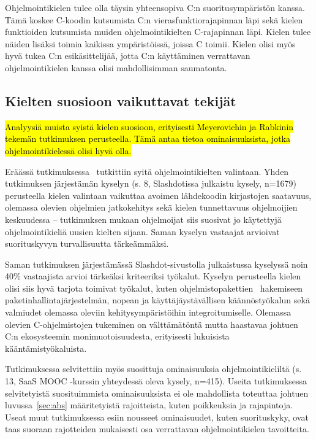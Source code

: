 \newpage

Ohjelmointikielen tulee olla täysin yhteensopiva C:n suoritusympäristön kanssa.
Tämä koskee C-koodin kutsumista C:n vierasfunktiorajapinnan
läpi sekä kielen funktioiden kutsumista
muiden ohjelmointikielten C-rajapinnan läpi. Kielen tulee näiden lisäksi toimia
kaikissa ympäristöissä, joissa C toimii. Kielen olisi myös hyvä tukea C:n
esikäsittelijää, jotta C:n käyttäminen verrattavan ohjelmointikielen kanssa
olisi mahdollisimman saumatonta.

\subsection{Kielten suosioon vaikuttavat tekijät}

\hl{Analyysiä muista syistä kielen suosioon, erityisesti Meyerovichin ja
Rabkinin tekemän tutkimuksen perusteella. Tämä antaa tietoa ominaisuuksista,
jotka ohjelmointikielessä olisi hyvä olla.}

Eräässä tutkimuksessa~\citep{empiricalpopularity} tutkittiin syitä
ohjelmointikielten valintaan. Yhden tutkimuksen järjestämän kyselyn (s. 8,
\mbox{Slashdotissa} julkaistu kysely, n=1679) perusteella kielen valintaan
vaikuttaa avoimen lähdekoodin kirjastojen saatavuus, olemassa olevien ohjelmien
jatkokehitys sekä kielen tunnettavuus ohjelmoijien keskuudessa -- tutkimuksen
mukaan ohjelmoijat siis suosivat jo käytettyjä ohjelmointikieliä uusien kielten
sijaan. Saman kyselyn vastaajat arvioivat suorituskyvyn turvallisuutta
tärkeämmäksi.

Saman tutkimuksen järjestämässä Slashdot-sivustolla julkaistussa kyselyssä noin
40\% vastaajista arvioi tärkeäksi kriteeriksi työkalut. Kyselyn perusteella
kielen olisi siis hyvä tarjota toimivat työkalut, kuten
ohjelmistopakettien~ hakemiseen
paketinhallintajärjestelmän, nopean ja
käyttäjäystävällisen käännöstyökalun sekä valmiudet olemassa oleviin
kehitysympäristöihin integroitumiselle. Olemassa olevien C-ohjelmistojen
tukeminen on välttämätöntä mutta haastavaa johtuen C:n ekosysteemin
monimuotoisuudesta, erityisesti lukuisista kääntämistyökaluista.

Tutkimuksessa selvitettiin myös suosittuja ominaisuuksia ohjelmointikieliltä
(s. 13, SaaS MOOC -kurssin yhteydessä oleva kysely, n=415). Useita
tutkimuksessa selvitetyistä suosituimmista ominaisuuksista ei ole mahdollista
toteuttaa johtuen luvussa~\ref{sec:abs} määritetyistä rajoitteista, kuten
poikkeuksia ja rajapintoja. Useat muut tutkimuksessa esiin nousseet
ominaisuudet, kuten suorituskyky, ovat taas suoraan rajotteiden mukaisesti osa
verrattavan ohjelmointikielen tavoitteita.

